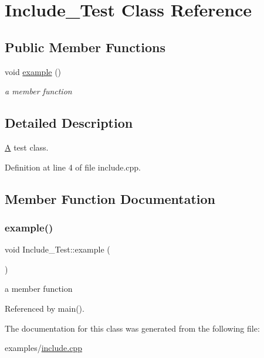 \hypertarget{class_include___test}{}\section{Include\+\_\+\+Test Class Reference}
\label{class_include___test}
\subsection*{Public Member Functions}
\begin{DoxyCompactItemize}
\item 
void \mbox{\hyperlink{class_include___test_aa286655e8f7f6a8ad203ef5fd8548b81}{example}} ()
\begin{DoxyCompactList}\small\item\em a member function \end{DoxyCompactList}\end{DoxyCompactItemize}


\subsection{Detailed Description}
\mbox{\hyperlink{class_a}{A}} test class. 

Definition at line 4 of file include.\+cpp.



\subsection{Member Function Documentation}
\mbox{\label{class_include___test_aa286655e8f7f6a8ad203ef5fd8548b81}} 
\subsubsection{\texorpdfstring{example()}{example()}}
{\footnotesize\ttfamily void Include\+\_\+\+Test\+::example (\begin{DoxyParamCaption}{ }\end{DoxyParamCaption})}



a member function 



Referenced by main().



The documentation for this class was generated from the following file\+:\begin{DoxyCompactItemize}
\item 
examples/\mbox{\hyperlink{include_8cpp}{include.\+cpp}}\end{DoxyCompactItemize}
